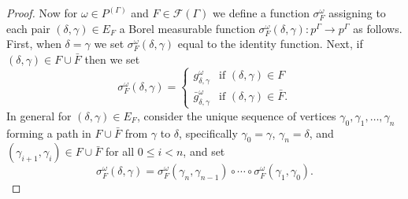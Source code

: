 \documentclass[10pt,a4paper]{amsart}
\def\cal{\mathcal}
\begin{document}
\begin{proof}
	Now for $\omega \in P^{(\Gamma)}$ and $F \in \cal F(\Gamma)$ we define a function $\sigma_F^\omega$ assigning to each pair $(\delta, \gamma) \in E_F$ a Borel measurable function $\sigma_F^\omega(\delta, \gamma) : p^\Gamma \rightarrow p^\Gamma$ as follows. First, when $\delta = \gamma$ we set $\sigma_F^\omega(\delta, \gamma)$ equal to the identity function. Next, if $(\delta, \gamma) \in F \cup \bar F$ then we set
	\[\sigma_F^\omega(\delta, \gamma) = \begin{cases}
		g_{\delta, \gamma}^\omega & \text{if } (\delta, \gamma) \in F\\
		\bar g_{\delta, \gamma}^\omega & \text{if } (\delta, \gamma) \in \bar F.
	\end{cases}\]
	In general for $(\delta, \gamma) \in E_F$, consider the unique sequence of vertices $\gamma_0, \gamma_1, \ldots, \gamma_n$ forming a path in $F \cup \bar F$ from $\gamma$ to $\delta$, specifically $\gamma_0 = \gamma$, $\gamma_n = \delta$, and $(\gamma_{i+1}, \gamma_i) \in F \cup \bar F$ for all $0 \leq i < n$, and set
	\[\sigma_F^\omega(\delta, \gamma) = \sigma_F^\omega(\gamma_n, \gamma_{n-1}) \circ \cdots \circ \sigma_F^\omega(\gamma_1, \gamma_0).\]
	

\end{proof}
\end{document}
